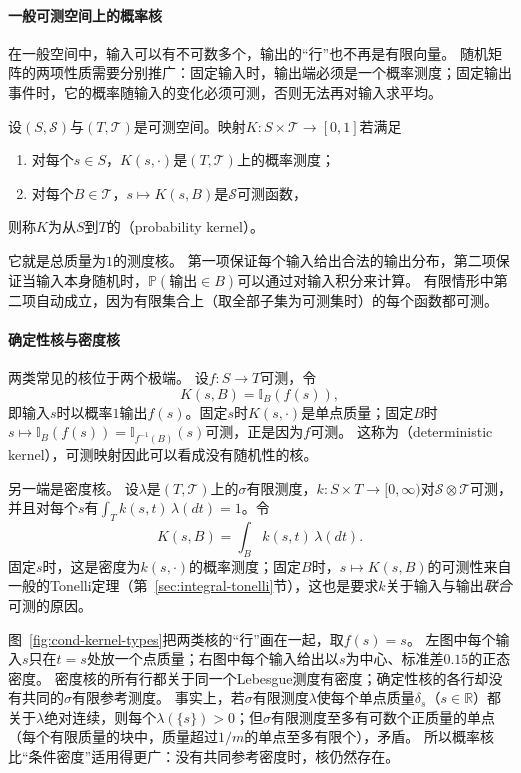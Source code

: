 \paragraph{一般可测空间上的概率核}
在一般空间中，输入可以有不可数多个，输出的“行”也不再是有限向量。
随机矩阵的两项性质需要分别推广：固定输入时，输出端必须是一个概率测度；固定输出事件时，它的概率随输入的变化必须可测，否则无法再对输入求平均。

\begin{definition}[概率核]
\label{def:cond-kernel}
设$(S,\mathcal S)$与$(T,\mathcal T)$是可测空间。映射$K:S\times\mathcal T\to[0,1]$若满足
\begin{enumerate}
  \item 对每个$s\in S$，$K(s,\cdot)$是$(T,\mathcal T)$上的概率测度；
  \item 对每个$B\in\mathcal T$，$s\mapsto K(s,B)$是$\mathcal S$可测函数，
\end{enumerate}
则称$K$为从$S$到$T$的（probability kernel）。
\end{definition}

它就是总质量为$1$的测度核。
第一项保证每个输入给出合法的输出分布，第二项保证当输入本身随机时，$\mathbb P(\text{输出}\in B)$可以通过对输入积分来计算。
有限情形中第二项自动成立，因为有限集合上（取全部子集为可测集时）的每个函数都可测。

\paragraph{确定性核与密度核}
两类常见的核位于两个极端。
设$f:S\to T$可测，令
\[
  K(s,B)=\mathbb I_B(f(s)),
\]
即输入$s$时以概率$1$输出$f(s)$。固定$s$时$K(s,\cdot)$是单点质量；固定$B$时$s\mapsto\mathbb I_B(f(s))=\mathbb I_{f^{-1}(B)}(s)$可测，正是因为$f$可测。
这称为（deterministic kernel），可测映射因此可以看成没有随机性的核。

另一端是密度核。
设$\lambda$是$(T,\mathcal T)$上的$\sigma$有限测度，$k:S\times T\to[0,\infty)$对$\mathcal S\otimes\mathcal T$可测，并且对每个$s$有$\int_Tk(s,t)\,\lambda(dt)=1$。令
\[
  K(s,B)=\int_Bk(s,t)\,\lambda(dt).
\]
固定$s$时，这是密度为$k(s,\cdot)$的概率测度；固定$B$时，$s\mapsto K(s,B)$的可测性来自一般的Tonelli定理（第~\ref{sec:integral-tonelli}节），这也是要求$k$关于输入与输出\emph{联合}可测的原因。

图~\ref{fig:cond-kernel-types}把两类核的“行”画在一起，取$f(s)=s$。
左图中每个输入$s$只在$t=s$处放一个点质量；右图中每个输入给出以$s$为中心、标准差$0.15$的正态密度。
密度核的所有行都关于同一个Lebesgue测度有密度；确定性核的各行却没有共同的$\sigma$有限参考测度。
事实上，若$\sigma$有限测度$\lambda$使每个单点质量$\delta_s$（$s\in\mathbb R$）都关于$\lambda$绝对连续，则每个$\lambda(\{s\})>0$；但$\sigma$有限测度至多有可数个正质量的单点（每个有限质量的块中，质量超过$1/m$的单点至多有限个），矛盾。
所以概率核比“条件密度”适用得更广：没有共同参考密度时，核仍然存在。

